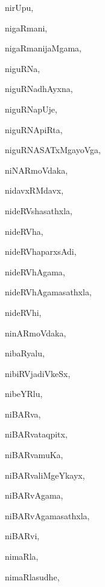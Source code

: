 \begin{multicols}{3}
{\noindent
{nirUpu}, \pageref{nirUpu}

\noindent
{nigaRmani}, \pageref{nigaRmani}

\noindent
{nigaRmanijaMgama}, \pageref{nigaRmanijaMgama}

\noindent
{niguRNa}, \pageref{niguRNa}

\noindent
{niguRNadhAyxna}, \pageref{niguRNadhAyxna}

\noindent
{niguRNapUje}, \pageref{niguRNapUje}

\noindent
{niguRNApiRta}, \pageref{niguRNApiRta}

\noindent
{niguRNASATxMgayoVga}, \pageref{niguRNASATxMgayoVga}

\noindent
{niNARmoVdaka}, \pageref{niNARmoVdaka}

\noindent
{nidavxRMdavx}, \pageref{nidavxRMdavx}

\noindent
{nideRVshasathxla}, \pageref{nideRVshasathxla}

\noindent
{nideRVha}, \pageref{nideRVha}

\noindent
{nideRVhaparxsAdi}, \pageref{nideRVhaparxsAdi}

\noindent
{nideRVhAgama}, \pageref{nideRVhAgama}

\noindent
{nideRVhAgamasathxla}, \pageref{nideRVhAgamasathxla}

\noindent
{nideRVhi}, \pageref{nideRVhi}

\noindent
{ninARmoVdaka}, \pageref{ninARmoVdaka}

\noindent
{nibaRyalu}, \pageref{nibaRyalu}

\noindent
{nibiRVjadiVkeSx}, \pageref{nibiRVjadiVkeSx}

\noindent
{nibeYRlu}, \pageref{nibeYRlu}

\noindent
{niBARva}, \pageref{niBARva}

\noindent
{niBARvataqpitx}, \pageref{niBARvataqpitx}

\noindent
{niBARvamuKa}, \pageref{niBARvamuKa}

\noindent
{niBARvaliMgeYkayx}, \pageref{niBARvaliMgeYkayx}

\noindent
{niBARvAgama}, \pageref{niBARvAgama}

\noindent
{niBARvAgamasathxla}, \pageref{niBARvAgamasathxla}

\noindent
{niBARvi}, \pageref{niBARvi}

\noindent
{nimaRla}, \pageref{nimaRla}

\noindent
{nimaRlasudhe}, \pageref{nimaRlasudhe}

}
\end{multicols}
